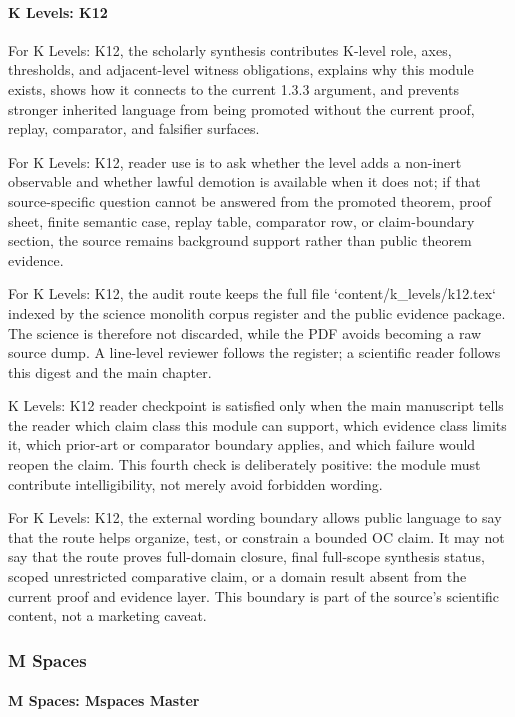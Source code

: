 \paragraph{K Levels: K12}

For K Levels: K12, the scholarly synthesis contributes K-level role, axes, thresholds, and adjacent-level witness obligations, explains why this module exists, shows how it connects to the current 1.3.3 argument, and prevents stronger inherited language from being promoted without the current proof, replay, comparator, and falsifier surfaces.


For K Levels: K12, reader use is to ask whether the level adds a non-inert observable and whether lawful demotion is available when it does not; if that source-specific question cannot be answered from the promoted theorem, proof sheet, finite semantic case, replay table, comparator row, or claim-boundary section, the source remains background support rather than public theorem evidence.


For K Levels: K12, the audit route keeps the full file `content/k\_levels/k12.tex` indexed by the science monolith corpus register and the public evidence package. The science is therefore not discarded, while the PDF avoids becoming a raw source dump. A line-level reviewer follows the register; a scientific reader follows this digest and the main chapter.


K Levels: K12 reader checkpoint is satisfied only when the main manuscript tells the reader which claim class this module can support, which evidence class limits it, which prior-art or comparator boundary applies, and which failure would reopen the claim. This fourth check is deliberately positive: the module must contribute intelligibility, not merely avoid forbidden wording.


For K Levels: K12, the external wording boundary allows public language to say that the route helps organize, test, or constrain a bounded OC claim. It may not say that the route proves full-domain closure, final full-scope synthesis status, scoped unrestricted comparative claim, or a domain result absent from the current proof and evidence layer. This boundary is part of the source's scientific content, not a marketing caveat.


\subsubsection{M Spaces}

\paragraph{M Spaces: Mspaces Master}

